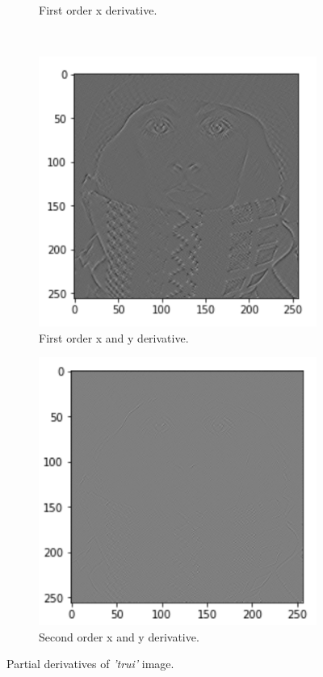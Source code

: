 \begin{figure}[H]
\begin{subfigure}[b]{0.45\textwidth}
		\caption{First order x derivative.}
	\end{subfigure}
	\hfill
	\\
	\begin{subfigure}[b]{0.45\textwidth}
		\centering
		\includegraphics[width=\textwidth]{Materials/3211}
		\caption{First order x and y derivative.}
	\end{subfigure}
	\hfill
	\begin{subfigure}[b]{0.45\textwidth}
		\centering
		\includegraphics[width=\textwidth]{Materials/3222}
		\caption{Second order x and y derivative.}
	\end{subfigure}
	\caption{Partial derivatives of \textit{'trui'} image.}
	\label{deriv}
\end{figure}

